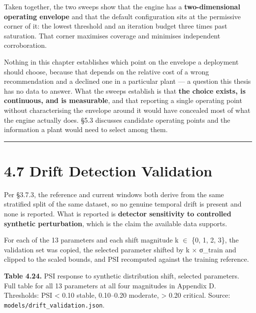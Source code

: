 Taken together, the two sweeps show that the engine has a \textbf{two-dimensional operating envelope} and that the default configuration sits at the permissive corner of it: the lowest threshold and an iteration budget three times past saturation. That corner maximises coverage and minimises independent corroboration.

Nothing in this chapter establishes which point on the envelope a deployment should choose, because that depends on the relative cost of a wrong recommendation and a declined one in a particular plant --- a question this thesis has no data to answer. What the sweeps establish is that \textbf{the choice exists, is continuous, and is measurable}, and that reporting a single operating point without characterising the envelope around it would have concealed most of what the engine actually does. §5.3 discusses candidate operating points and the information a plant would need to select among them.

\begin{center}\rule{0.5\linewidth}{0.5pt}\end{center}

\hypertarget{drift-detection-validation}{%
\section{4.7 Drift Detection Validation}\label{drift-detection-validation}}

Per §3.7.3, the reference and current windows both derive from the same stratified split of the same dataset, so no genuine temporal drift is present and none is reported. What is reported is \textbf{detector sensitivity to controlled synthetic perturbation}, which is the claim the available data supports.

For each of the 13 parameters and each shift magnitude k $\in$ \{0, 1, 2, 3\}, the validation set was copied, the selected parameter shifted by k × σ\_train and clipped to the scaled bounds, and PSI recomputed against the training reference.

\textbf{Table 4.24.} PSI response to synthetic distribution shift, selected parameters. Full table for all 13 parameters at all four magnitudes in Appendix D. Thresholds: PSI \textless{} 0.10 stable, 0.10--0.20 moderate, \textgreater{} 0.20 critical. Source: \texttt{models/drift\_validation.json}.

